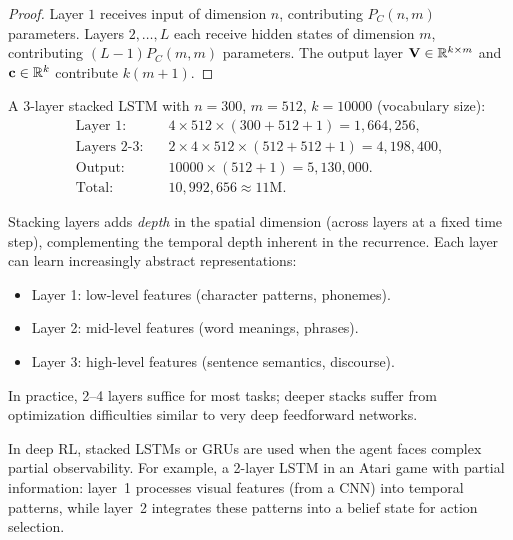 \documentclass[11pt,a4paper]{article}
\begin{document}
\begin{proof}
Layer $1$ receives input of dimension $n$, contributing $P_C(n, m)$
parameters.  Layers $2, \ldots, L$ each receive hidden states of
dimension $m$, contributing $(L-1) P_C(m, m)$ parameters.  The
output layer $\mathbf{V} \in \mathbb{R}^{k \times m}$ and $\mathbf{c} \in
\mathbb{R}^k$ contribute $k(m + 1)$.
\end{proof}

\begin{example}
\label{ex:stacked-lstm}
A 3-layer stacked LSTM with $n = 300$, $m = 512$, $k = 10000$
(vocabulary size):
\begin{align*}
  \text{Layer 1:} &\quad 4 \times 512 \times (300 + 512 + 1)
    = 1{,}664{,}256, \\
  \text{Layers 2-3:} &\quad 2 \times 4 \times 512 \times
    (512 + 512 + 1) = 4{,}198{,}400, \\
  \text{Output:} &\quad 10000 \times (512 + 1) = 5{,}130{,}000. \\
  \text{Total:} &\quad 10{,}992{,}656 \approx 11\text{M}.
\end{align*}
\end{example}

\begin{remark}
\label{rem:depth-vs-width}
Stacking layers adds \emph{depth} in the spatial dimension (across
layers at a fixed time step), complementing the temporal depth
inherent in the recurrence.  Each layer can learn increasingly
abstract representations:
\begin{itemize}[nosep]
  \item Layer 1: low-level features (character patterns, phonemes).
  \item Layer 2: mid-level features (word meanings, phrases).
  \item Layer 3: high-level features (sentence semantics, discourse).
\end{itemize}
In practice, 2--4 layers suffice for most tasks; deeper stacks
suffer from optimization difficulties similar to very deep
feedforward networks.
\end{remark}

\begin{rlconnection}[title={Deep Recurrent RL}]
In deep RL, stacked LSTMs or GRUs are used when the agent faces
complex partial observability.  For example, a 2-layer LSTM in an
Atari game with partial information: layer~1 processes visual
features (from a CNN) into temporal patterns, while layer~2
integrates these patterns into a belief state for action selection.
\end{rlconnection}
\end{document}
